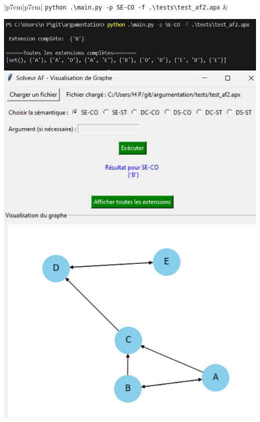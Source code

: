 \documentclass{rapportECL}
\begin{document}
\begin{longtable}{|p{7cm}|p{7cm}|}
	\texttt{python .\textbackslash main.py -p SE-CO -f .\textbackslash tests\textbackslash test\_af2.apx} & 
	\begin{minipage}{\linewidth}
		\centering
		\includegraphics[width=\linewidth]{img/a_consol.png} \\[0.2cm]
		\includegraphics[width=\linewidth]{img/a_ui.png}
	\end{minipage} \\[0.2cm]


\end{longtable}
\end{document}
